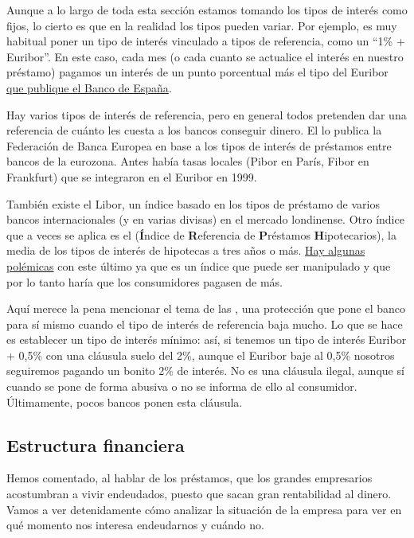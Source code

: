 \documentclass[nochap,palatino,shortheader]{apuntes}
\newcommand{\study}[1]{#1} \newcommand{\substudy}[1]{#1}
\begin{document}
Aunque a lo largo de toda esta sección estamos tomando los tipos de interés como fijos, lo cierto es que en la realidad los tipos pueden variar. Por ejemplo, es muy habitual poner un tipo de interés vinculado a tipos de referencia, como un ``1\% + Euribor''. En este caso, cada mes (o cada cuanto se actualice el interés en nuestro préstamo) pagamos un interés de un punto porcentual más el tipo del Euribor \href{http://www.bde.es/clientebanca/es/areas/Tipos_de_Interes/Tipos_de_interes/}{que publique el Banco de España}.

Hay varios tipos de interés de referencia, pero en general todos \substudy{pretenden dar una referencia de cuánto les cuesta a los bancos conseguir dinero}. El  lo publica la \substudy{Federación de Banca Europea} \study{en base a los tipos de interés de préstamos entre bancos de la eurozona}.
Antes había tasas locales (Pibor en París, Fibor en Frankfurt) que se integraron en el Euribor en 1999.

También existe el \study{Libor}, un índice basado en los tipos de préstamo de varios bancos internacionales (y en varias divisas) en el mercado londinense. Otro índice que a veces se aplica es el  (\substudy{\textbf{Í}ndice de \textbf{R}eferencia de \textbf{P}réstamos \textbf{H}ipotecarios}), la media de los tipos de interés de hipotecas a tres años o más.
\href{https://es.wikipedia.org/wiki/%C3%8Dndice_de_Referencia_de_Pr%C3%A9stamos_Hipotecarios}{Hay algunas polémicas} con este último ya que es un índice que \substudy{puede ser manipulado} y que por lo tanto haría que los consumidores pagasen de más.

Aquí merece la pena mencionar el tema de las , una protección que pone el banco para sí mismo cuando el tipo de interés de referencia baja mucho. Lo que se hace es establecer un \study{tipo de interés mínimo}:
así, si tenemos un tipo de interés Euribor + 0,5\% con una cláusula suelo del 2\%, aunque el Euribor baje al 0,5\% nosotros seguiremos pagando un bonito 2\% de interés. \substudy{No es una cláusula ilegal, aunque sí cuando} se pone de forma abusiva o no se informa de ello al consumidor.
Últimamente, pocos bancos ponen esta cláusula.



\subsection{Estructura financiera}
Hemos comentado, al hablar de los préstamos, que los grandes empresarios acostumbran a vivir endeudados, puesto que sacan gran rentabilidad al dinero. Vamos a ver detenidamente cómo analizar la situación de la empresa para ver en qué momento nos interesa endeudarnos y cuándo no.
\end{document}
